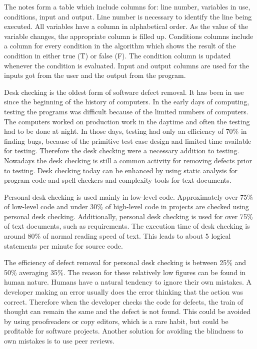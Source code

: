 The notes form a table which include columns for: line number, variables in use, conditions, input and output. Line number is necessary to identify the line being executed. All variables have a column in alphabetical order. As the value of the variable changes, the appropriate column is filled up. Conditions columns include a column for every condition in the algorithm which shows the result of the condition in either true (T) or false (F). The condition column is updated whenever the condition is evaluated. Input and output columns are used for the inputs got from the user and the output from the program.~\cite{campionDescCheck}

Desk checking is the oldest form of software defect removal. It has been in use since the beginning of the history of computers. In the early days of computing, testing the programs was difficult because of the limited numbers of computers. The computers worked on production work in the daytime and often the testing had to be done at night. In those days, testing had only an efficiency of 70\% in finding bugs, because of the primitive test case design and limited time available for testing. Therefore the desk checking were a necessary addition to testing. Nowadays the desk checking is still a common activity for removing defects prior to testing. Desk checking today can be enhanced by using static analysis for program code and spell checkers and complexity tools for text documents.

Personal desk checking is used mainly in low-level code. Approximately over 75\% of low-level code and under 30\% of high-level code in projects are checked using personal desk checking. Additionally, personal desk checking is used for over 75\% of text documents, such as requirements. The execution time of desk checking is around 80\% of normal reading speed of text. This leads to about 5 logical statements per minute for source code.

The efficiency of defect removal for personal desk checking is between 25\% and 50\% averaging 35\%. The reason for these relatively low figures can be found in human nature. Humans have a natural tendency to ignore their own mistakes. A developer making an error usually does the error thinking that the action was correct. Therefore when the developer checks the code for defects, the train of thought can remain the same and the defect is not found. This could be avoided by using proofreaders or copy editors, which is a rare habit, but could be profitable for software projects. Another solution for avoiding the blindness to own mistakes is to use peer reviews.


